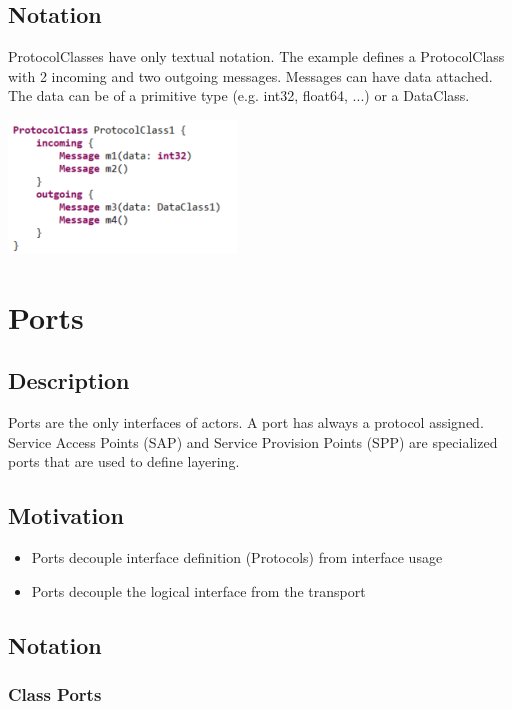 \subsection{Notation}

ProtocolClasses have only textual notation. 
The example defines a ProtocolClass with 2 incoming and two outgoing messages. Messages can have data 
attached. The data can be of a primitive type (e.g. int32, float64, ...) or a DataClass.

\includegraphics{images/040-ProtocolClassTextualNotation.png}

\section{Ports}

\subsection{Description}

Ports are the only interfaces of actors. A port has always a protocol assigned. 
Service Access Points (SAP) and Service Provision Points (SPP) are specialized ports that are used to 
define layering.

\subsection{Motivation}

\begin{itemize}
\item Ports decouple interface definition (Protocols) from interface usage
\item Ports decouple the logical interface from the transport 
\end{itemize}

\subsection{Notation}

\subsubsection{Class Ports}

